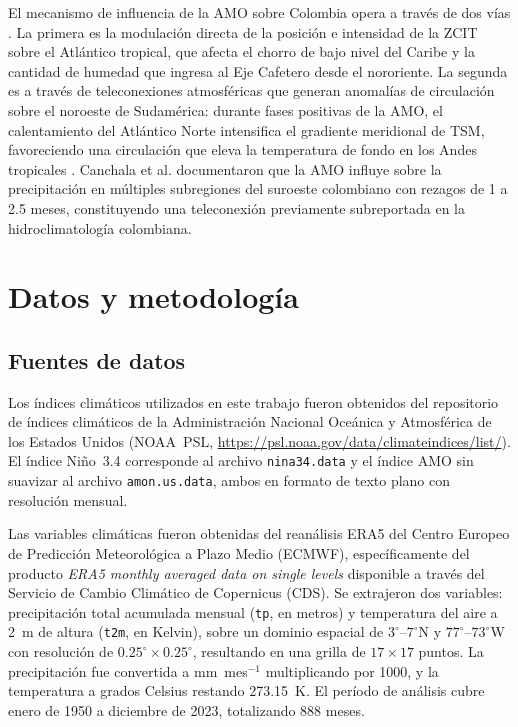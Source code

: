 \documentclass[12pt, a4paper]{article}
\begin{document}
El mecanismo de influencia de la AMO sobre Colombia opera a través de dos vías
\citep{Knight2006, Hoyos2018}. La primera es la modulación directa de la posición
e intensidad de la ZCIT sobre el Atlántico tropical, que afecta el chorro de bajo
nivel del Caribe y la cantidad de humedad que ingresa al Eje Cafetero desde el
nororiente. La segunda es a través de teleconexiones atmosféricas que generan
anomalías de circulación sobre el noroeste de Sudamérica: durante fases positivas
de la AMO, el calentamiento del Atlántico Norte intensifica el gradiente
meridional de TSM, favoreciendo una circulación que eleva la temperatura de fondo
en los Andes tropicales \citep{DuqueGardeazabal2025}. Canchala et al.
\citep{Canchala2020} documentaron que la AMO influye sobre la precipitación en
múltiples subregiones del suroeste colombiano con rezagos de 1 a 2.5 meses,
constituyendo una teleconexión previamente subreportada en la hidroclimatología
colombiana.

\section{Datos y metodología}

\subsection{Fuentes de datos}

Los índices climáticos utilizados en este trabajo fueron obtenidos del repositorio
de índices climáticos de la Administración Nacional Oceánica y Atmosférica de los
Estados Unidos (NOAA~PSL, \url{https://psl.noaa.gov/data/climateindices/list/}).
El índice Niño~3.4 corresponde al archivo \texttt{nina34.data} y el índice AMO sin
suavizar al archivo \texttt{amon.us.data}, ambos en formato de texto plano con
resolución mensual.

Las variables climáticas fueron obtenidas del reanálisis ERA5 del Centro Europeo
de Predicción Meteorológica a Plazo Medio (ECMWF), específicamente del producto
\textit{ERA5 monthly averaged data on single levels} disponible a través del
Servicio de Cambio Climático de Copernicus (CDS). Se extrajeron dos variables:
precipitación total acumulada mensual (\texttt{tp}, en metros) y temperatura del
aire a 2~m de altura (\texttt{t2m}, en Kelvin), sobre un dominio espacial de
$3^\circ$--$7^\circ$N y $77^\circ$--$73^\circ$W con resolución de $0.25^\circ
\times 0.25^\circ$, resultando en una grilla de $17 \times 17$ puntos. La
precipitación fue convertida a mm~mes$^{-1}$ multiplicando por 1000, y la
temperatura a grados Celsius restando 273.15~K. El período de análisis cubre
enero de 1950 a diciembre de 2023, totalizando 888 meses.
\end{document}
